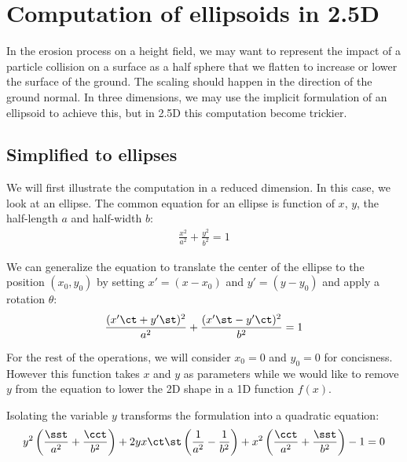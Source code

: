 \zzcommand{\ct}{\cos \theta}
\zzcommand{\cct}{\cos^2 \theta}
\zzcommand{\st}{\sin \theta}
\zzcommand{\sst}{\sin^2 \theta}

\zzcommand{\cp}{\cos \phi}
\zzcommand{\ccp}{\cos^2 \phi}
\zzcommand{\sp}{\sin \phi}
\zzcommand{\ssp}{\sin^2 \phi}


\chapter{Computation of ellipsoids in 2.5D}
\label{chap:computation-ellipsoid}

In the erosion process on a height field, we may want to represent the impact of a particle collision on a surface as a half sphere that we flatten to increase or lower the surface of the ground. The scaling should happen in the direction of the ground normal. In three dimensions, we may use the implicit formulation of an ellipsoid to achieve this, but in 2.5D this computation become trickier.

\section{Simplified to ellipses}

We will first illustrate the computation in a reduced dimension. In this case, we look at an ellipse.
The common equation for an ellipse is function of $x$, $y$, the half-length $a$ and half-width $b$:
\begin{align}
    \label{eq:ellipsoid_simplified-ellipse}
    \frac{x^2}{a^2} + \frac{y^2}{b^2} = 1
\end{align}

We can generalize the equation to translate the center of the ellipse to the position $(x_0, y_0)$ by setting $x'=(x-x_0)$ and $y'=(y-y_0)$ and apply a rotation $\theta$:
\begin{align}
    \label{eq:ellipsoid_general-ellipse}
    \frac{(x' \ct + y' \st)^2}{a^2} + \frac{(x' \st - y' \ct)^2}{b^2} = 1
\end{align}

For the rest of the operations, we will consider $x_0=0$ and $y_0=0$ for concisness.
However this function takes $x$ and $y$ as parameters while we would like to remove $y$ from the equation to lower the 2D shape in a 1D function $f(x)$.

Isolating the variable $y$ transforms the formulation into a quadratic equation:
\begin{align}
    \label{eq:ellipsoid_full-ellipse}
    y^2 \left( \frac{\sst}{a^2} + \frac{\cct}{b^2} \right) + 2yx \ct \st \left( \frac{1}{a^2} - \frac{1}{b^2} \right) + x^2 \left( \frac{\cct}{a^2} + \frac{\sst}{b^2} \right) - 1 = 0
\end{align}

